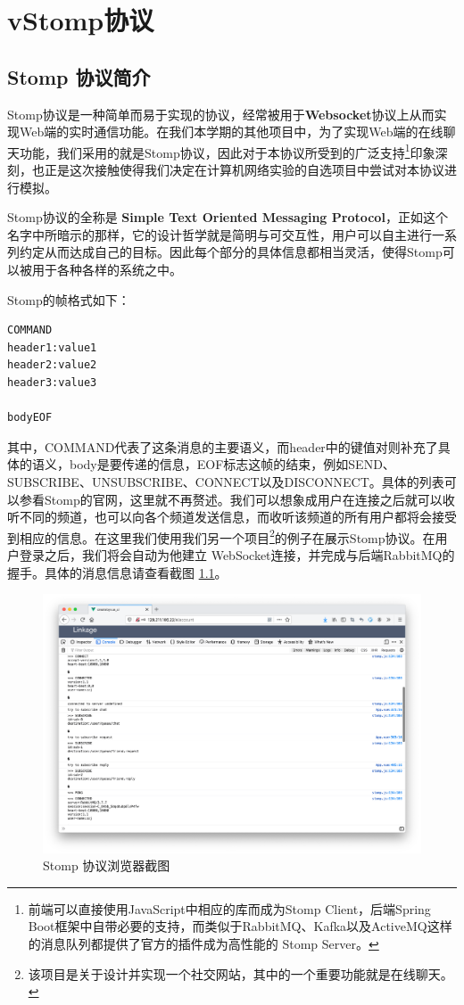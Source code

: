 \documentclass{ctexrep}
\begin{document}
	
	\chapter{vStomp协议}
	\section{Stomp 协议简介}
	Stomp协议是一种简单而易于实现的协议，经常被用于\textbf{Websocket}协议上从而实现Web端的实时通信功能。在我们本学期的其他项目中，为了实现Web端的在线聊天功能，我们采用的就是Stomp协议，因此对于本协议所受到的广泛支持\footnote{前端可以直接使用JavaScript中相应的库而成为Stomp Client，后端Spring Boot框架中自带必要的支持，而类似于RabbitMQ、Kafka以及ActiveMQ这样的消息队列都提供了官方的插件成为高性能的 Stomp Server。}印象深刻，也正是这次接触使得我们决定在计算机网络实验的自选项目中尝试对本协议进行模拟。
	
	Stomp协议的全称是 \textbf{Simple Text Oriented Messaging Protocol}，正如这个名字中所暗示的那样，它的设计哲学就是简明与可交互性，用户可以自主进行一系列约定从而达成自己的目标。因此每个部分的具体信息都相当灵活，使得Stomp可以被用于各种各样的系统之中。
	
	Stomp的帧格式如下：
	\begin{lstlisting}
COMMAND
header1:value1
header2:value2
header3:value3

bodyEOF
	\end{lstlisting}
	
	其中，COMMAND代表了这条消息的主要语义，而header中的键值对则补充了具体的语义，body是要传递的信息，EOF标志这帧的结束，例如SEND、SUBSCRIBE、UNSUBSCRIBE、CONNECT以及DISCONNECT。具体的列表可以参看Stomp的官网，这里就不再赘述。我们可以想象成用户在连接之后就可以收听不同的频道，也可以向各个频道发送信息，而收听该频道的所有用户都将会接受到相应的信息。在这里我们使用我们另一个项目\footnote{该项目是关于设计并实现一个社交网站，其中的一个重要功能就是在线聊天。}的例子在展示Stomp协议。在用户登录之后，我们将会自动为他建立 WebSocket连接，并完成与后端RabbitMQ的握手。具体的消息信息请查看截图 \ref{fig:stompdemo}。
	\begin{figure}[H]
		\centering
		\includegraphics[width=0.9\linewidth]{img/stompDemo}
		\caption{Stomp 协议浏览器截图}
		\label{fig:stompdemo}
	\end{figure}
\end{document}
